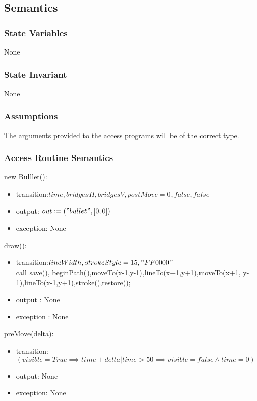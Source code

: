 \documentclass[12pt]{article}
\begin{document}
\subsection* {Semantics}

\subsubsection* {State Variables}
None


\subsubsection* {State Invariant}
None

\subsubsection* {Assumptions}

The arguments provided to the access programs will be of the correct type.

\subsubsection* {Access Routine Semantics}

\noindent new Bulllet():
\begin{itemize}
\item transition:$time, bridgesH, bridgesV , postMove = 0,false,false$ 
\item output: $out := ("bullet",[0,0])$
\item exception: None
\end{itemize}

\noindent draw():
\begin{itemize}
\item transition:$lineWidth,strokeStyle = 15,"FF0000"$\\
call save(), beginPath(),moveTo(x-1,y-1),lineTo(x+1,y+1),moveTo(x+1, y-1),lineTo(x-1,y+1),stroke(),restore();
\item output : None
\item exception : None
\end{itemize}

\noindent preMove(delta):
\begin{itemize}
\item transition:$(visible = True \implies time + delta | time > 50 \implies visible = false \wedge time = 0)$
\item output: None
\item exception: None
\end{itemize}
\end{document}
